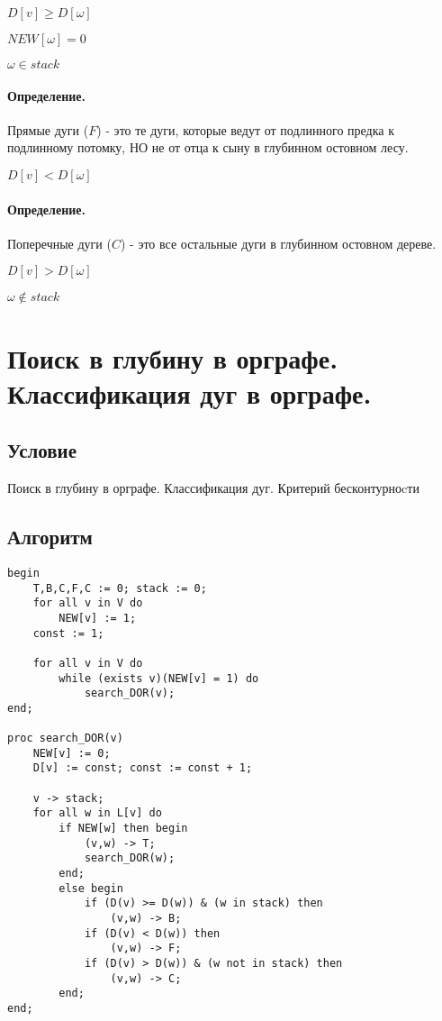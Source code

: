 \documentclass{report}
\begin{document}
$D[v] \ge  D[\omega]$

$NEW[\omega] = 0$

$\omega \in stack$

\paragraph*{Определение.}
Прямые дуги ($F$) - это те дуги, которые ведут от подлинного предка к подлинному потомку, НО
не от отца к сыну в глубинном остовном лесу.

$D[v] < D[\omega]$

\paragraph*{Определение.}
Поперечные дуги ($C$) - это все остальные дуги в глубинном остовном дереве.

$D[v] > D[\omega]$

$\omega \notin stack $

\newpage

\section{Поиск в глубину в орграфе. Классификация дуг в орграфе.}
\subsection{Условие}
Поиск в глубину в орграфе. Классификация дуг. Критерий
бесконтурноcти

\subsection{Алгоритм}

\begin{lstlisting}
begin
	T,B,C,F,C := 0; stack := 0;
	for all v in V do
		NEW[v] := 1;
	const := 1;

	for all v in V do
		while (exists v)(NEW[v] = 1) do
			search_DOR(v);
end;

proc search_DOR(v)
	NEW[v] := 0;
	D[v] := const; const := const + 1;

	v -> stack;
	for all w in L[v] do
		if NEW[w] then begin
			(v,w) -> T;
			search_DOR(w);
		end;
		else begin
			if (D(v) >= D(w)) & (w in stack) then
				(v,w) -> B;
			if (D(v) < D(w)) then
				(v,w) -> F;
			if (D(v) > D(w)) & (w not in stack) then
				(v,w) -> C;
		end;
end;
\end{lstlisting}
\end{document}
